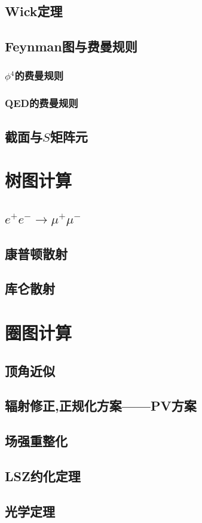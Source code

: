 \documentclass[a4paper,11pt]{book}
\begin{document}
\section{Wick定理}
\section{Feynman图与费曼规则}
\subsection{$\phi^4$的费曼规则}
\subsection{QED的费曼规则}
\section{截面与$S$矩阵元}
\chapter{树图计算}
\section{$e^+e^-\rightarrow\mu^+\mu^-$}
\section{康普顿散射}
\section{库仑散射}
\chapter{圈图计算}
\section{顶角近似}
\section{辐射修正,正规化方案——PV方案}
\section{场强重整化}
\section{LSZ约化定理}
\section{光学定理}
\end{document}
